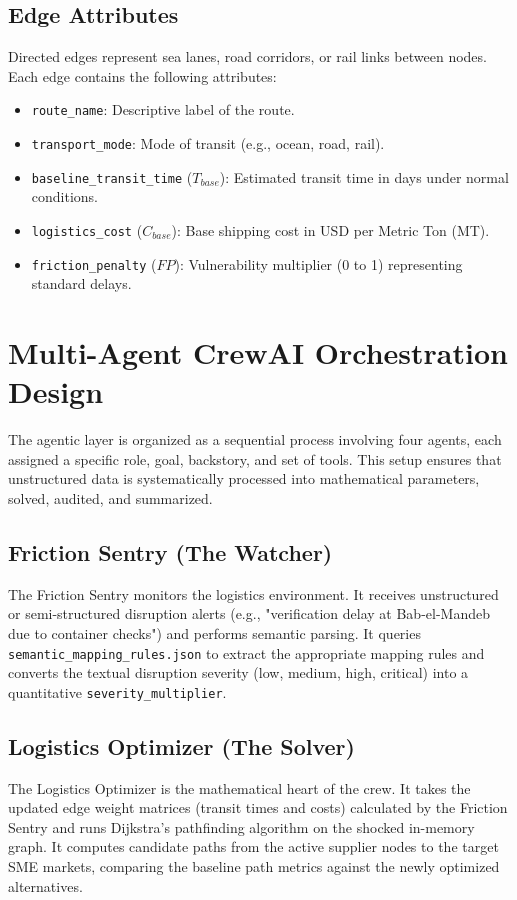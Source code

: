 \subsection{Edge Attributes}
Directed edges represent sea lanes, road corridors, or rail links between nodes. Each edge contains the following attributes:
\begin{itemize}
    \item \texttt{route\_name}: Descriptive label of the route.
    \item \texttt{transport\_mode}: Mode of transit (e.g., ocean, road, rail).
    \item \texttt{baseline\_transit\_time} ($T_{base}$): Estimated transit time in days under normal conditions.
    \item \texttt{logistics\_cost} ($C_{base}$): Base shipping cost in USD per Metric Ton (MT).
    \item \texttt{friction\_penalty} ($FP$): Vulnerability multiplier (0 to 1) representing standard delays.
\end{itemize}

\section{Multi-Agent CrewAI Orchestration Design}
The agentic layer is organized as a sequential process involving four agents, each assigned a specific role, goal, backstory, and set of tools. This setup ensures that unstructured data is systematically processed into mathematical parameters, solved, audited, and summarized.

\subsection{Friction Sentry (The Watcher)}
The Friction Sentry monitors the logistics environment. It receives unstructured or semi-structured disruption alerts (e.g., "verification delay at Bab-el-Mandeb due to container checks") and performs semantic parsing. It queries \texttt{semantic\_mapping\_rules.json} to extract the appropriate mapping rules and converts the textual disruption severity (low, medium, high, critical) into a quantitative \texttt{severity\_multiplier}.

\subsection{Logistics Optimizer (The Solver)}
The Logistics Optimizer is the mathematical heart of the crew. It takes the updated edge weight matrices (transit times and costs) calculated by the Friction Sentry and runs Dijkstra's pathfinding algorithm on the shocked in-memory graph. It computes candidate paths from the active supplier nodes to the target SME markets, comparing the baseline path metrics against the newly optimized alternatives.

